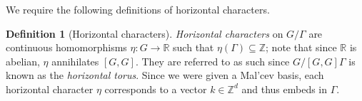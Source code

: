 \documentclass[11pt, a4paper]{amsart}
\theoremstyle{plain}
\theoremstyle{plain}
\newtheorem{lemma}{Lemma}
\theoremstyle{definition}
\newtheorem{definition}{Definition}
\theoremstyle{remark}
\numberwithin{equation}{section}
\numberwithin{lemma}{section}
\numberwithin{proposition}{section}
\numberwithin{corollary}{section}
\numberwithin{definition}{section}
\numberwithin{claim}{section}
\begin{document}

We require the following definitions of horizontal characters.
\begin{definition}[Horizontal characters]
\emph{Horizontal characters} on $G/\Gamma$ are continuous homomorphisms $\eta\colon G \to \mathbb{R}$ such that $\eta(\Gamma) \subseteq \mathbb{Z}$; note that since $\mathbb{R}$ is abelian, $\eta$ annihilates $[G, G]$. They are referred to as such since $G/[G, G]\Gamma$ is known as the \emph{horizontal torus}. Since we were given a Mal'cev basis, each horizontal character $\eta$ corresponds to a vector $k \in \mathbb{Z}^d$ and thus embeds in $\Gamma$.    
\end{definition}
\end{document}
